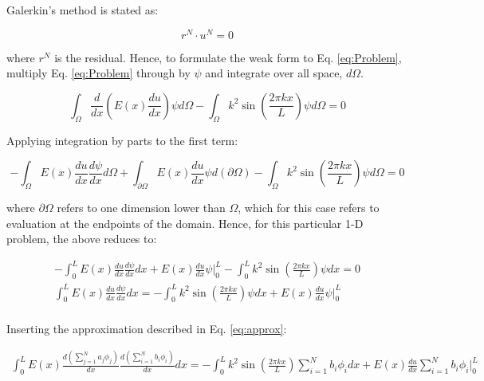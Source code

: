 \documentclass[10pt]{article}
\begin{document}
Galerkin's method is stated as:

\begin{equation}
r^N\cdot u^N=0
\end{equation}

where \(r^N\) is the residual. Hence, to formulate the weak form to Eq. \eqref{eq:Problem}, multiply Eq. \eqref{eq:Problem} through by \(\psi\) and integrate over all space, \(d\Omega\).

\begin{equation}
\int_{\Omega}^{}\frac{d}{dx}\left(E(x)\frac{du}{dx}\right)\psi d\Omega-\int_{\Omega}^{}k^2\sin{\left(\frac{2\pi kx}{L}\right)}\psi d\Omega=0
\end{equation}

Applying integration by parts to the first term:

\begin{equation}
-\int_{\Omega}^{}E(x)\frac{du}{dx}\frac{d\psi}{dx}d\Omega+\int_{\partial\Omega}^{}E(x)\frac{du}{dx}\psi d(\partial\Omega)-\int_{\Omega}^{}k^2\sin{\left(\frac{2\pi kx}{L}\right)}\psi d\Omega=0
\end{equation}

where \(\partial\Omega\) refers to one dimension lower than \(\Omega\), which for this case refers to evaluation at the endpoints of the domain. Hence, for this particular 1-D problem, the above reduces to:

\begin{equation}
\begin{aligned}
-\int_{0}^{L}E(x)\frac{du}{dx}\frac{d\psi}{dx}dx+ E(x)\frac{du}{dx}\psi\biggr\vert_{0}^{L}-\int_{0}^{L}k^2\sin{\left(\frac{2\pi kx}{L}\right)}\psi dx=0\\
\int_{0}^{L}E(x)\frac{du}{dx}\frac{d\psi}{dx}dx=-\int_{0}^{L}k^2\sin{\left(\frac{2\pi kx}{L}\right)}\psi dx+E(x)\frac{du}{dx}\psi\biggr\vert_{0}^{L}\\
\end{aligned}
\end{equation}

Inserting the approximation described in Eq. \eqref{eq:approx}:

\begin{equation}
\begin{aligned}
\int_{0}^{L}E(x)\frac{d\left(\sum_{j=1}^{N}a_j\phi_j\right)}{dx}\frac{d\left(\sum_{i=1}^{N}b_i\phi_i\right)}{dx}dx=-\int_{0}^{L}k^2\sin{\left(\frac{2\pi kx}{L}\right)}\sum_{i=1}^{N}b_i\phi_idx+E(x)\frac{du}{dx}\sum_{i=1}^{N}b_i\phi_i\biggr\vert_{0}^{L}\\
\end{aligned}
\end{equation}
\end{document}
